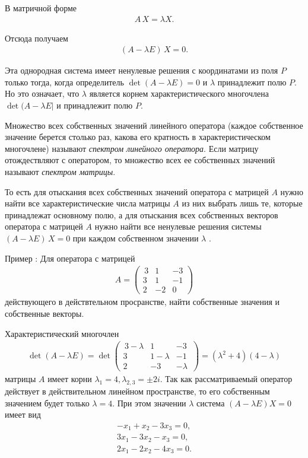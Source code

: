 \documentclass[%
	11pt,
	a4paper,
	utf8,
		]{article}
\begin{document}
В матричной форме
\begin{align*}
	A \, X = \lambda X.
\end{align*}

Отсюда получаем
\begin{align*}
	(A - \lambda E) \, X = 0.
\end{align*}

Эта однородная система имеет ненулевые решения с координатами из поля $ P $ только тогда, когда определитель $ \det (A - \lambda E) = 0 $ и $ \lambda $ принадлежит полю $ P $. Но это означает, что $ \lambda $ является корнем характеристического многочлена $ \det (A - \lambda E | $ и принадлежит полю $ P $.

Множество всех собственных значений линейного оператора (каждое собственное значение берется столько раз, какова его кратность в характеристическом многочлене) называют \emph{спектром линейного оператора}. Если матрицу отождествляют с оператором, то множество всех ее собственных значений называют \emph{спектром матрицы}.

То есть для отыскания всех собственных значений оператора с матрицей $ A $ нужно найти все характеристические числа матрицы $ A $ из них выбрать лишь те, которые принадлежат основному полю, а для отыскания всех собственных векторов оператора с матрицей $ A $ нужно найти все ненулевые решения системы $ (A - \lambda E) \, X = 0 $ при каждом собственном значении $ \lambda $ \cite[]{shevtsov:linal-2012}.

Пример \cite[]{shevtsov:linal-2012}: Для оператора с матрицей
\begin{align*}
	A = \begin{pmatrix}
		\,
		3 & 1 & -3 \\
		3 & 1 & -1 \\
		2 & -2 & 0
		\,
	\end{pmatrix}
\end{align*}
действующего в действтельном просранстве, найти собственные значения и собственные векторы.

Характеристический многочлен
\begin{align*}
	\det (A - \lambda E) = \det \begin{pmatrix}
		\,
		3 - \lambda & 1 & -3 \\
		3 & 1 - \lambda & -1 \\
		2 & -3 & -\lambda 
		\,
	\end{pmatrix}
    = (\lambda^2 + 4)(4 - \lambda)
\end{align*}
матрицы $ A $ имеет корни $ \lambda_1 = 4, \lambda_{2,3} = \pm 2 i $. Так как рассматриваемый оператор действует в действительном линейном пространстве, то его собственным значением будет только $ \lambda = 4 $. При этом значении $ \lambda $ система $ (A - \lambda E) X = 0 $ имеет вид
\begin{align*}
	- x_1 + x_2 - 3 x_3 = 0, \\
	3 x_1 - 3 x_2 - x_3 = 0, \\
	2 x_1 - 2 x_2 - 4 x_3 = 0.
\end{align*}
\end{document}
